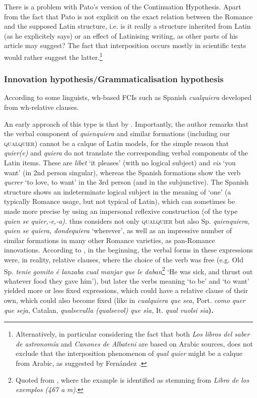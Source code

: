 There is a problem with Pato’s version of the {Continuation Hypothesis}. Apart from the fact that Pato is not explicit on the exact relation between the Romance and the supposed Latin structure, i.e. is it really a structure inherited from Latin (as he explicitely says) or an effect of Latinising writing, as other parts of his article may suggest? The fact that interposition occurs mostly in scientific texts would rather suggest the latter.\footnote{Alternatively, in particular considering the fact that both {\textit{Los libros del saber de astronomía}} {and} {\textit{Canones de Albateni}} {are based on Arabic sources, \citet[306]{Pato2012} does not exclude that the interposition phenomenon of} {\textit{qual quier}} {might be a calque from Arabic, as suggested by Fernández \citet{Fernandez1992}.}}

\subsubsection{{Innovation hypothesis/Grammaticalisation hypothesis}} \label{sec:2.6.1.2}

According to some linguists, wh-based FCIs such as Spanish \textit{cualquiera} developed from wh-relative clauses.

An early approach of this type is that by \citet{Lombard1938,Lombard1947}. Importantly, the author remarks that the verbal component of \textit{quienquiera} and similar formations (including our \textsc{qualquier}) cannot be a calque of Latin models, for the simple reason that \textit{quier(e)} and \textit{quiera} do not translate the corresponding verbal components of the Latin items. These are \textit{libet} ‘it pleases’ (with no logical subject) and \textit{vis} ‘you want’ (in 2nd person singular), whereas the Spanish formations show the verb \textit{querer} ‘to love, to want’ in the 3rd person (and in the subjunctive). The Spanish structure shows an indeterminate logical subject in the meaning of ‘one’ (a typically Romance usage, but not typical of Latin), which can sometimes be made more precise by using an impersonal reflexive construction (of the type \textit{quien se quier,-e,-a).} \citet{Lombard1938,Lombard1947} thus considers not only \textsc{qualquier} but also Sp. \textit{quienquiera, quien se quiera, dondequiera} ‘wherever’, as well as an impressive number of similar formations in many other Romance varieties, as pan-Romance innovations. According to \citet[187]{Lombard1938}, in the beginning, the verbal forms in these expressions were, in reality, relative clauses, where the choice of the verb was free (e.g. Old Sp. \textit{tenie gomito é lanzaba cual manjar que le daban}\footnote{Quoted from \citet[159]{Gessner1895}, where the example is identified as stemming from \textit{Libro de los exemplos (467 a m)}.} ‘He was sick, and thrust out whatever food they gave him’), but later the verbs meaning ‘to be’ and ‘to want’ yielded more or less fixed expressions, which could have a relative clause of their own, which could also become fixed (like in \textit{cualquiera que sea,} Port. \textit{como quer que seja}, Catalan, \textit{qualsevulla (qualsevol) que sìa,} It. \textit{qual vuolsi sia}\textbf{).}

